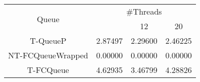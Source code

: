 \begin{tabular}{|c|c|c|c|}
\hline
\multirow{2}{*}{Queue} & \multicolumn{3}{c|}{\#Threads}\\\cline{2-4}& \quad 4 & 12 & 20\\
\hline
\hline
T-QueueP & 2.87497 & 2.29600 & 2.46225\\
NT-FCQueueWrapped & 0.00000 & 0.00000 & 0.00000\\
T-FCQueue & 4.62935 & 3.46799 & 4.28826\\
\hline\end{tabular}
